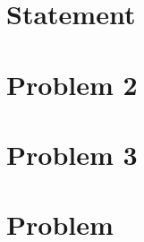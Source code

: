 \documentclass{article}
\numberwithin{equation}{section} %
\numberwithin{figure}{section} %
\begin{document}

\section{Statement}  %
\newpage \section{Problem 2}  %
\newpage \section{Problem 3}  %
\newpage \section{Problem}  %
\end{document}
